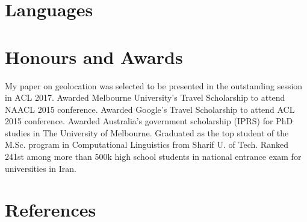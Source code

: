 \documentclass[11pt,a4paper,sans]{moderncv} %
\begin{document}

\section{Languages}

\section{Honours and Awards}
   {My paper on geolocation was selected to be presented in the outstanding session in ACL 2017.}
   {Awarded Melbourne University's Travel Scholarship to attend NAACL 2015 conference.}
   {Awarded Google's Travel Scholarship to attend ACL 2015 conference.}
   {Awarded Australia's government scholarship (IPRS) for PhD studies in The University of Melbourne.}
   {Graduated as the top student of the M.Sc. program in Computational Linguistics from Sharif U. of Tech.}
   {Ranked 241st among more than 500k high school students in national entrance exam for universities in Iran.}

\section{References}


\end{document}
